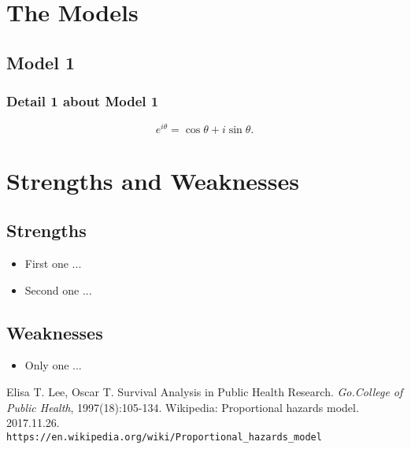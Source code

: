 \section{The Models}

\subsection{Model 1}
\subsubsection{Detail 1 about Model 1}
\begin{equation}
    e^{i\theta}=\cos\theta+i\sin\theta.
\end{equation}

\section{Strengths and Weaknesses}
\subsection{Strengths}
\begin{itemize}
    \item First one ...
    \item Second one ...
\end{itemize}

\subsection{Weaknesses}
\begin{itemize}
    \item Only one ...
 \end{itemize}

\begin{thebibliography}{99}
Elisa T. Lee, Oscar T. Survival Analysis in Public Health Research. \emph{Go.College of Public Health}, 1997(18):105-134.
Wikipedia: Proportional hazards model. 2017.11.26. \texttt{\\https://en.wikipedia.org/wiki/Proportional\_{}hazards\_{}model}
\end{thebibliography}

